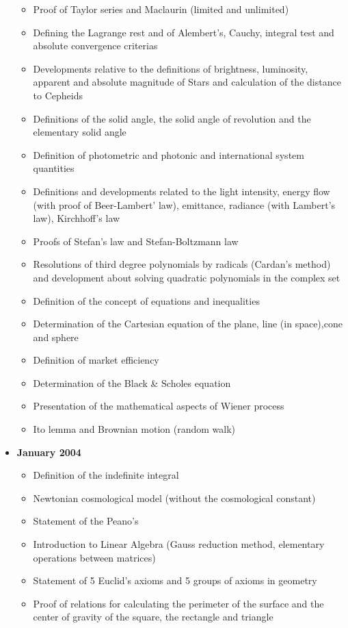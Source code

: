 \documentclass[12pt,a4paper,twoside,openright]{report}
\newcounter{def}
\theoremstyle{definition}
\theoremstyle{itexmp}
\numberwithin{equation}{section}
\begin{document}
\begin{itemize}
\begin{itemize}[noitemsep]
			\item Proof of Taylor series and Maclaurin (limited and unlimited)
			\item Defining the Lagrange rest and of Alembert's, Cauchy, integral test and absolute convergence criterias
			\item Developments relative to the definitions of brightness, luminosity, apparent and absolute magnitude of Stars and calculation of the distance to Cepheids
			\item Definitions of the solid angle, the solid angle of revolution and the elementary solid angle
			\item Definition of photometric and photonic and international system quantities
			\item Definitions and developments related to the light intensity, energy flow (with proof of Beer-Lambert' law), emittance, radiance (with Lambert's law), Kirchhoff's law
			\item Proofs of Stefan's law and Stefan-Boltzmann law
			\item Resolutions of third degree polynomials by radicals (Cardan's method) and development about solving quadratic polynomials in the complex set
			\item Definition of the concept of equations and inequalities
			\item Determination of the Cartesian equation of the plane, line (in space),cone and sphere
			\item Definition of market efficiency
			\item Determination of the Black \& Scholes equation 
			\item Presentation of the mathematical aspects of Wiener process
			\item Ito lemma and Brownian motion (random walk)
		\end{itemize}
	\item \textbf{January 2004}
		\begin{itemize}[noitemsep]
			\item Definition of the indefinite integral
			\item Newtonian cosmological model (without the cosmological constant)
			\item Statement of the Peano's
			\item Introduction to Linear Algebra (Gauss reduction method, elementary operations between matrices)
			\item Statement of 5 Euclid's axioms and 5 groups of axioms in geometry
			\item Proof of relations for calculating the perimeter of the surface and the center of gravity of the square, the rectangle and triangle

\end{itemize}
\end{itemize}
\end{document}

